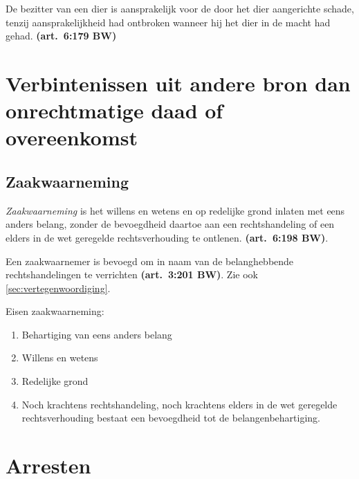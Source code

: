 \documentclass[a4paper]{article}
\newcommand{\art}[1]{\textbf{(art.~#1 BW)}\xspace}
\begin{document}
De bezitter van een dier is aansprakelijk voor de door het dier aangerichte
schade, tenzij aansprakelijkheid had ontbroken wanneer hij het dier in de
macht had gehad. \art{6:179}


\section{Verbintenissen uit andere bron dan onrechtmatige daad of overeenkomst}

\subsection{Zaakwaarneming}

\emph{Zaakwaarneming} is het willens en wetens en op redelijke grond inlaten
met eens anders belang, zonder de bevoegdheid daartoe aan een rechtshandeling
of een elders in de wet geregelde rechtsverhouding te ontlenen. \art{6:198}.

Een zaakwaarnemer is bevoegd om in naam van de belanghebbende
rechtshandelingen te verrichten \art{3:201}. Zie ook
\ref{sec:vertegenwoordiging}.

Eisen zaakwaarneming:
\begin{enumerate}
  \item Behartiging van eens anders belang
  \item Willens en wetens
  \item Redelijke grond
  \item Noch krachtens rechtshandeling, noch krachtens elders in de wet
    geregelde rechtsverhouding bestaat een bevoegdheid tot de
    belangenbehartiging.
\end{enumerate}


\section{Arresten}
\end{document}
